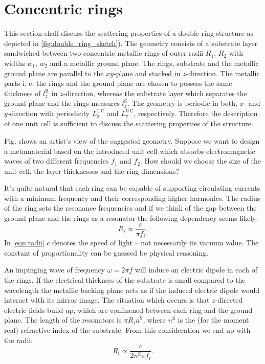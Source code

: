 \section{Concentric rings}
\label{sec:double_rings}
This section shall discuss the scattering properties of a double-ring structure as depicted in \cref{fig:double_ring_sketch}). 
The geometry consists of a substrate layer sandwiched between two concentric metallic rings of outer radii $R_{1},\,R_{2}$ with widths $w_1,\,w_2$ and a metallic ground plane. The rings, substrate and the metallic ground plane are parallel to the $xy$-plane and stacked in $z$-direction.
The metallic parts i. e. the rings and the ground plane are chosen to possess  the same thickness of $l_z^{\mathrm{R}}$ in $z$-direction, whereas the substrate layer which separates the ground plane and the rings measures $l_z^{\mathrm{S}}$.
The geometry is periodic in both, $x$- and $y$-direction with periodicity $L_\mathrm{x}^\mathrm{UC}$ and $L_\mathrm{y}^\mathrm{UC}$, respectively. Therefore the description of one unit cell is sufficient to discuss the scattering properties of the structure.

Fig.  shows an artist's view of the suggested geometry. Suppose we want to design a metamaterial based on the introduced unit cell which absorbs electromagnetic waves of two different frequencies $f_1$ and $f_2$. How should we choose the size of the unit cell, the layer thicknesses and the ring dimensions? 

It's quite natural that each ring can be capable of supporting circulating currents with a minimum frequency and their corresponding higher harmonics. The radius of the ring sets the resonance frequencies and if we think of the gap between the ground plane and the rings as a resonator the following dependency seems likely:
\begin{equation}
R_i \propto \frac{c}{\pi f_i}.
\label{eqn:radii}
\end{equation}
In \cref{eqn:radii} $c$ denotes the speed of light -- not necessarily its vacuum value. The constant of proportionality can be guessed be physical reasoning. 

An impinging wave of frequency $\omega = 2\pi f$ will induce an electric dipole in each of the rings. If the electrical thickness of the substrate is small compared to the wavelength the metallic backing plane acts as if the induced electric dipole would interact with its mirror image. The situation which occurs is that $z$-directed electric fields build up, which are confinened between each ring and the ground plane.
The length of the resonators is $\pi R_i n^\mathrm{S}$, where $n^\mathrm{S}$ is the (for the moment real) refractive index of the substrate.
From this consideration we end up with the radii:
\begin{equation}
R_i \propto \frac{c}{2 n^\mathrm{S}\pi f_i}.
\label{eqn:radii_precise}
\end{equation}

